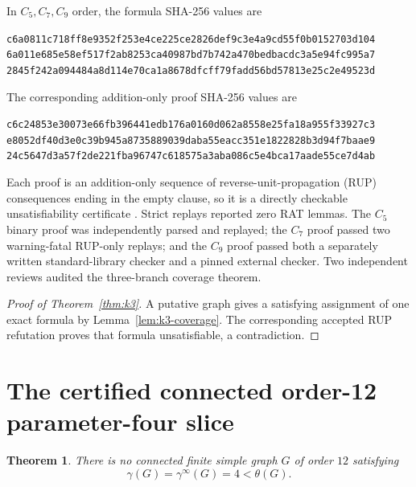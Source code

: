 \documentclass[11pt]{article}
\newtheorem{theorem}{Theorem}[section]
\theoremstyle{definition}
\theoremstyle{remark}
\newcommand{\gaminf}{\gamma^{\infty}}
\newcommand{\filehash}[1]{\nolinkurl{#1}}
\begin{document}
In \(C_5,C_7,C_9\) order, the formula SHA-256 values are
\begin{center}
\begin{minipage}{0.95\linewidth}
\filehash{c6a0811c718ff8e9352f253e4ce225ce2826def9c3e4a9cd55f0b0152703d104}\\
\filehash{6a011e685e58ef517f2ab8253ca40987bd7b742a470bedbacdc3a5e94fc995a7}\\
\filehash{2845f242a094484a8d114e70ca1a8678dfcff79fadd56bd57813e25c2e49523d}
\end{minipage}
\end{center}
The corresponding addition-only proof SHA-256 values are
\begin{center}
\begin{minipage}{0.95\linewidth}
\filehash{c6c24853e30073e66fb396441edb176a0160d062a8558e25fa18a955f33927c3}\\
\filehash{e8052df40d3e0c39b945a8735889039daba55eacc351e1822828b3d94f7baae9}\\
\filehash{24c5647d3a57f2de221fba96747c618575a3aba086c5e4bca17aade55ce7d4ab}
\end{minipage}
\end{center}

Each proof is an addition-only sequence of reverse-unit-propagation (RUP)
consequences ending in the empty clause, so it is a directly checkable
unsatisfiability certificate \cite{WetzlerHeuleHunt2014}.  Strict replays
reported zero RAT lemmas.  The \(C_5\) binary proof was independently
parsed and replayed; the \(C_7\) proof passed two warning-fatal RUP-only
replays; and the \(C_9\) proof passed both a separately written
standard-library checker and a pinned external checker.  Two independent
reviews audited the three-branch coverage theorem.

\begin{proof}[Proof of Theorem~\ref{thm:k3}]
A putative graph gives a satisfying assignment of one exact formula by
Lemma~\ref{lem:k3-coverage}.  The corresponding accepted RUP refutation
proves that formula unsatisfiable, a contradiction.
\end{proof}

\section{The certified connected order-12 parameter-four slice}
\label{sec:k4}

\begin{theorem}\label{thm:k4}
There is no connected finite simple graph \(G\) of order \(12\) satisfying
\[
  \gamma(G)=\gaminf(G)=4<\theta(G).
\tag{5.1}
\]
\end{theorem}
\end{document}
